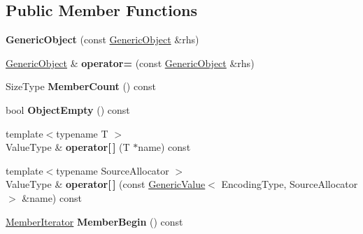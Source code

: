 \subsection*{Public Member Functions}
\begin{DoxyCompactItemize}
\item 
{\bfseries Generic\+Object} (const \hyperlink{class_generic_object}{Generic\+Object} \&rhs)\hypertarget{class_generic_object_a10173c42d0e8a71ca0e3ae75d800887a}{}\label{class_generic_object_a10173c42d0e8a71ca0e3ae75d800887a}

\item 
\hyperlink{class_generic_object}{Generic\+Object} \& {\bfseries operator=} (const \hyperlink{class_generic_object}{Generic\+Object} \&rhs)\hypertarget{class_generic_object_af8984f76d6f3b13039c6d3b8e217f747}{}\label{class_generic_object_af8984f76d6f3b13039c6d3b8e217f747}

\item 
Size\+Type {\bfseries Member\+Count} () const \hypertarget{class_generic_object_ab3772740b811ed417924cebdace1d190}{}\label{class_generic_object_ab3772740b811ed417924cebdace1d190}

\item 
bool {\bfseries Object\+Empty} () const \hypertarget{class_generic_object_a410e5dfd7fa047852ecb4b719a74f842}{}\label{class_generic_object_a410e5dfd7fa047852ecb4b719a74f842}

\item 
{\footnotesize template$<$typename T $>$ }\\Value\+Type \& {\bfseries operator\mbox{[}$\,$\mbox{]}} (T $\ast$name) const \hypertarget{class_generic_object_af3db47f1615353d0c5ce974c2fbe7885}{}\label{class_generic_object_af3db47f1615353d0c5ce974c2fbe7885}

\item 
{\footnotesize template$<$typename Source\+Allocator $>$ }\\Value\+Type \& {\bfseries operator\mbox{[}$\,$\mbox{]}} (const \hyperlink{class_generic_value}{Generic\+Value}$<$ Encoding\+Type, Source\+Allocator $>$ \&name) const \hypertarget{class_generic_object_aac0937f20bfdc94380641bb02cefbf98}{}\label{class_generic_object_aac0937f20bfdc94380641bb02cefbf98}

\item 
\hyperlink{class_generic_member_iterator}{Member\+Iterator} {\bfseries Member\+Begin} () const \hypertarget{class_generic_object_abf56b2ac9cface0dffd21b541acb9511}{}\label{class_generic_object_abf56b2ac9cface0dffd21b541acb9511}


\end{DoxyCompactItemize}
